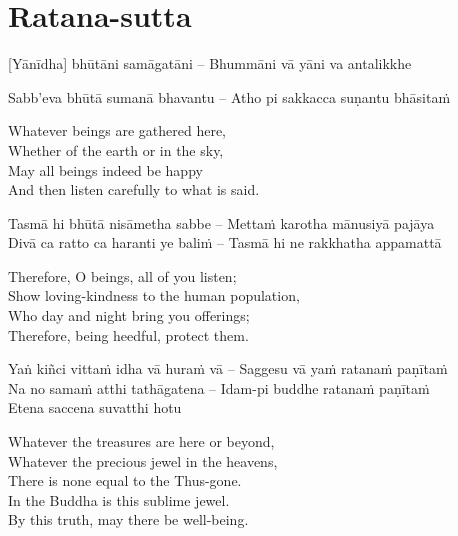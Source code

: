 \suttaRef{[Snp 2.4]}

\section{Ratana-sutta}
\label{ratana-sutta}

\vspace{-1em}

[Yānīdha] bhūtāni samāgatāni – Bhummāni vā yāni va antalikkhe\\
\begin{pali-hangtogether}
Sabb'eva bhūtā sumanā bhavantu – Atho pi sakkacca suṇantu bhāsitaṁ
\end{pali-hangtogether}

\begin{english-verses}
  Whatever beings are gathered here,\\
  Whether of the earth or in the sky,\\
  May all beings indeed be happy\\
  And then listen carefully to what is said.
\end{english-verses}

Tasmā hi bhūtā nisāmetha sabbe – Mettaṁ karotha mānusiyā pajāya\\
Divā ca ratto ca haranti ye baliṁ – Tasmā hi ne rakkhatha appamattā

\begin{english-verses}
  Therefore, O beings, all of you listen;\\
  Show loving-kindness to the human population,\\
  Who day and night bring you offerings;\\
  Therefore, being heedful, protect them.
\end{english-verses}

Yaṅ kiñci vittaṁ idha vā huraṁ vā – Saggesu vā yaṁ ratanaṁ paṇītaṁ\\
Na no samaṁ atthi tathāgatena – Idam-pi buddhe ratanaṁ paṇītaṁ\\
Etena saccena suvatthi hotu

\begin{english-verses}
  Whatever the treasures are here or beyond,\\
  Whatever the precious jewel in the heavens,\\
  There is none equal to the Thus-gone.\\
  In the Buddha is this sublime jewel.\\
  By this truth, may there be well-being.
\end{english-verses}

